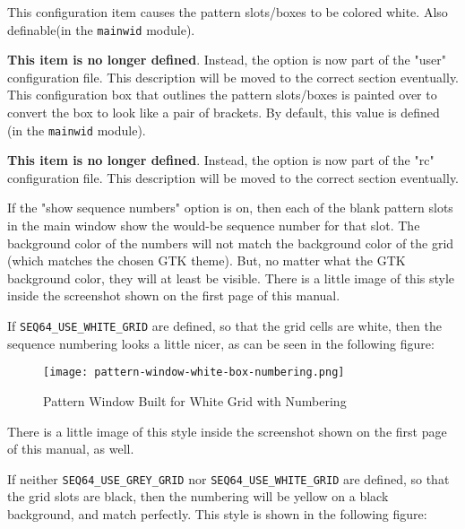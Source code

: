         This configuration item causes the pattern slots/boxes to be colored
        white.  Also definable(in the \texttt{mainwid} module).

        \textbf{This item is no longer defined}.
        Instead, the option is now part of the "user" configuration file.  This
        description will be moved to the correct section eventually.
        This configuration box that outlines the pattern slots/boxes is
        painted over to convert the box to look like a pair of brackets.
        By default, this value is defined (in the \texttt{mainwid} module).

        \textbf{This item is no longer defined}.
        Instead, the option is now part of the "rc" configuration file.  This
        description will be moved to the correct section eventually.

        If the "show sequence numbers" option is on, then each
        of the blank pattern slots in the main window show the would-be
        sequence number for that slot.  The background color of the numbers
        will not match the background color of the grid (which matches the
        chosen GTK theme).  But, no matter what the GTK background color, they
        will at least be visible.  There is a little image of this style inside
        the screenshot shown on the first page of this manual.

        If \texttt{SEQ64\_USE\_WHITE\_GRID}
        are defined, so that the grid cells are white, then the sequence
        numbering looks a little nicer, as can be seen in the following
        figure:

\begin{figure}[H]
   \centering 
   \texttt{[image: pattern-window-white-box-numbering.png]}
   \caption{Pattern Window Built for White Grid with Numbering}
   \label{fig:seq64_build_white_box_numbering}
\end{figure}

        There is a little image of this style inside the screenshot shown on
        the first page of this manual, as well.

        If neither \texttt{SEQ64\_USE\_GREY\_GRID} nor
        \texttt{SEQ64\_USE\_WHITE\_GRID} are defined, so that the grid slots
        are black, then the numbering will be yellow on a black background, and
        match perfectly.  This style is shown in the following figure:

